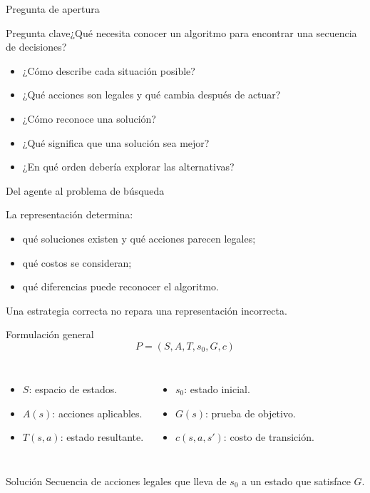 \documentclass[aspectratio=169,11pt]{beamer}
\newcommand{\pregunta}[1]{\begin{block}{Pregunta clave}#1\end{block}}
\begin{document}
\begin{frame}{Pregunta de apertura}
  \pregunta{¿Qué necesita conocer un algoritmo para encontrar una secuencia de decisiones?}
  \begin{itemize}
    \item ¿Cómo describe cada situación posible?
    \item ¿Qué acciones son legales y qué cambia después de actuar?
    \item ¿Cómo reconoce una solución?
    \item ¿Qué significa que una solución sea mejor?
    \item ¿En qué orden debería explorar las alternativas?
  \end{itemize}
\end{frame}

\begin{frame}{Del agente al problema de búsqueda}
  \centering
  \vfill
  La representación determina:
  \begin{itemize}
    \item qué soluciones existen y qué acciones parecen legales;
    \item qué costos se consideran;
    \item qué diferencias puede reconocer el algoritmo.
  \end{itemize}
  \alert{Una estrategia correcta no repara una representación incorrecta.}
\end{frame}

\begin{frame}{Formulación general}
  \[
    \boxed{P=(S,A,T,s_0,G,c)}
  \]
  \begin{columns}[T]
      \begin{itemize}
        \item $S$: espacio de estados.
        \item $A(s)$: acciones aplicables.
        \item $T(s,a)$: estado resultante.
      \end{itemize}
      \begin{itemize}
        \item $s_0$: estado inicial.
        \item $G(s)$: prueba de objetivo.
        \item $c(s,a,s')$: costo de transición.
      \end{itemize}
  \end{columns}
  \begin{block}{Solución}
    Secuencia de acciones legales que lleva de $s_0$ a un estado que satisface $G$.
  \end{block}
\end{frame}
\end{document}
